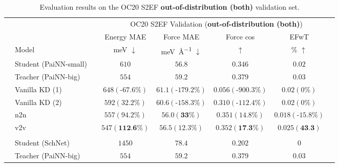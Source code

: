 \documentclass{article}
\begin{document}
\begin{table}[H]
\centering
\caption{Evaluation results on the OC20 S2EF \textbf{out-of-distribution (both)} validation set.}
\begin{tabular}{llcccccc}
\multicolumn{1}{c}{\multirow{3}{*}{}} & & & \multicolumn{5}{c}{OC20 S2EF Validation (\textbf{out-of-distribution (both)})} 
\\\cmidrule(r){4-7}
\multicolumn{1}{c}{}   &   &                   &      Energy MAE  &    Force MAE  & Force cos & EFwT \\
&   \multicolumn{1}{l}{Model}     &        &      \si{\milli\electronvolt} $\downarrow$   &    \si{\milli\electronvolt\per\angstrom} $\downarrow$     & $\uparrow$  & \% $\uparrow$ \\\cmidrule(r){1-7}
\parbox[t]{2mm}{} & Student (PaiNN-small)               &   &              $610$      &     $56.8$     &  $0.346$ &  $0.02$  \\
& Teacher (PaiNN-big)                  &   &              $554$        &   $59.2$     &   $0.379$      &   $0.03$    \\
& Vanilla KD (1)         &   &            $648 (\text{-}67.6\%)$          &          $61.1 (\text{-}179.2\%)$     &     $0.056 (\text{-}900.3\%)$        &  $0.02 (0\%)$   \\
& Vanilla KD (2)         &   &                $592 (32.2\%)$      &          $60.6 (\text{-}158.3\%)$     &     $0.310 (\text{-}112.4\%)$        &   $0.02 (0\%)$ \\
& n2n              &   &             $557 (94.2\%)$         &          $56.0 (\textbf{33}\%)$     &     $0.351 (14.8\%)$        & $0.018 (\text{-}15.8\%)$    \\
& v2v                &   &          $547 (\textbf{112.6\%})$            &          $56.5 (12.3\%)$     &     $0.352 (\textbf{17.3\%})$        & $0.025 (\textbf{43.3})$    \\
 \\
\parbox[t]{2mm}{} & Student (SchNet)                  &   &              $1450$     &   $78.4$    &  $0.202$  &  $0$   \\
& Teacher (PaiNN-big)                  &   &              $554$        &   $59.2$     &   $0.379$      &   $0.03$    \\

\end{tabular}
\end{table}
\end{document}
